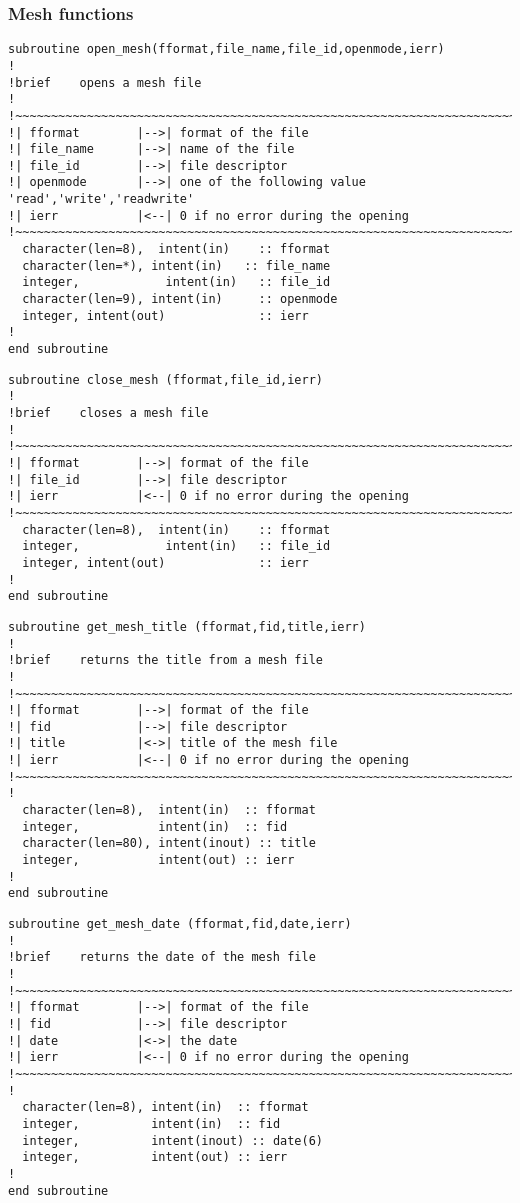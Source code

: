 \subsubsection{Mesh functions}
\begin{lstlisting}
subroutine open_mesh(fformat,file_name,file_id,openmode,ierr)
!
!brief    opens a mesh file
!
!~~~~~~~~~~~~~~~~~~~~~~~~~~~~~~~~~~~~~~~~~~~~~~~~~~~~~~~~~~~~~~~~~~~~~~~
!| fformat        |-->| format of the file
!| file_name      |-->| name of the file
!| file_id        |-->| file descriptor
!| openmode       |-->| one of the following value 'read','write','readwrite'
!| ierr           |<--| 0 if no error during the opening
!~~~~~~~~~~~~~~~~~~~~~~~~~~~~~~~~~~~~~~~~~~~~~~~~~~~~~~~~~~~~~~~~~~~~~~~
  character(len=8),  intent(in)    :: fformat
  character(len=*), intent(in)   :: file_name
  integer,            intent(in)   :: file_id
  character(len=9), intent(in)     :: openmode
  integer, intent(out)             :: ierr
!
end subroutine
\end{lstlisting}
%
\begin{lstlisting}
subroutine close_mesh (fformat,file_id,ierr)
!
!brief    closes a mesh file
!
!~~~~~~~~~~~~~~~~~~~~~~~~~~~~~~~~~~~~~~~~~~~~~~~~~~~~~~~~~~~~~~~~~~~~~~~
!| fformat        |-->| format of the file
!| file_id        |-->| file descriptor
!| ierr           |<--| 0 if no error during the opening
!~~~~~~~~~~~~~~~~~~~~~~~~~~~~~~~~~~~~~~~~~~~~~~~~~~~~~~~~~~~~~~~~~~~~~~~
  character(len=8),  intent(in)    :: fformat
  integer,            intent(in)   :: file_id
  integer, intent(out)             :: ierr
!
end subroutine
\end{lstlisting}
%
\begin{lstlisting}
subroutine get_mesh_title (fformat,fid,title,ierr)
!
!brief    returns the title from a mesh file
!
!~~~~~~~~~~~~~~~~~~~~~~~~~~~~~~~~~~~~~~~~~~~~~~~~~~~~~~~~~~~~~~~~~~~~~~~
!| fformat        |-->| format of the file
!| fid            |-->| file descriptor
!| title          |<->| title of the mesh file
!| ierr           |<--| 0 if no error during the opening
!~~~~~~~~~~~~~~~~~~~~~~~~~~~~~~~~~~~~~~~~~~~~~~~~~~~~~~~~~~~~~~~~~~~~~~~
!
  character(len=8),  intent(in)  :: fformat
  integer,           intent(in)  :: fid
  character(len=80), intent(inout) :: title
  integer,           intent(out) :: ierr
!
end subroutine
\end{lstlisting}
%
\begin{lstlisting}
subroutine get_mesh_date (fformat,fid,date,ierr)
!
!brief    returns the date of the mesh file
!
!~~~~~~~~~~~~~~~~~~~~~~~~~~~~~~~~~~~~~~~~~~~~~~~~~~~~~~~~~~~~~~~~~~~~~~~
!| fformat        |-->| format of the file
!| fid            |-->| file descriptor
!| date           |<->| the date
!| ierr           |<--| 0 if no error during the opening
!~~~~~~~~~~~~~~~~~~~~~~~~~~~~~~~~~~~~~~~~~~~~~~~~~~~~~~~~~~~~~~~~~~~~~~~
!
  character(len=8), intent(in)  :: fformat
  integer,          intent(in)  :: fid
  integer,          intent(inout) :: date(6)
  integer,          intent(out) :: ierr
!
end subroutine
\end{lstlisting}
